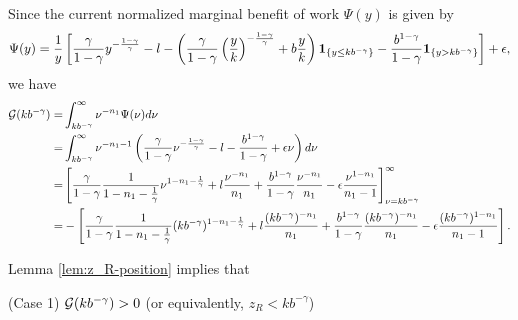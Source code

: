 \documentclass[a4paper,report, 11pt]{article}
\def\e{\epsilon}
\def\g{\gamma}
\begin{document}
{Since the current normalized marginal benefit of work $\Psi(y)$ is given by 
\begin{equation*}
\Psi(y)=\dfrac{1}{y}\left[\dfrac{\g}{1-\g}y^{-\frac{1-\g}{\g}}-l-\left(\dfrac{\g}{1-\g}\left(\dfrac{y}{k}\right)^{-\frac{1-\g}{\g}}+b\dfrac{y}{k}\right){\bf 1}_{\{y\le k b^{-\g} \}}-\dfrac{b^{1-\g}}{1-\g}{\bf 1}_{\{y>k b^{-\g}\}}\right]+\e,
\end{equation*}
we have
\begin{align*}
{\cal G}(kb^{-\g})=&\int_{kb^{-\g}}^\infty \nu^{-n_1}\Psi(\nu)d\nu\\
=&\int_{kb^{-\g}}^\infty \nu^{-n_1-1}\left(\dfrac{\g}{1-\g}\nu^{-\frac{1-\g}{\g}}-l-\dfrac{b^{1-\g}}{1-\g}+\e\nu\right)d\nu\\
=&\left[\dfrac{\g}{1-\g}\dfrac{1}{1-n_1-\frac{1}{\g}}\nu^{1-n_1-\frac{1}{\g}}+l\dfrac{\nu^{-n_1}}{n_1}+\dfrac{b^{1-\g}}{1-\g}\dfrac{\nu^{-n_1}}{n_1}-\e\dfrac{\nu^{1-n_1}}{n_1-1}\right]_{\nu=kb^{-\g}}^{\infty}\\
=&-\left[\dfrac{\g}{1-\g}\dfrac{1}{1-n_1-\frac{1}{\g}}(kb^{-\g})^{1-n_1-\frac{1}{\g}}+l\dfrac{(kb^{-\g})^{-n_1}}{n_1}+\dfrac{b^{1-\g}}{1-\g}\dfrac{(kb^{-\g})^{-n_1}}{n_1}-\e\dfrac{(kb^{-\g})^{1-n_1}}{n_1-1}\right].
\end{align*}

\noindent Lemma \ref{lem:z_R-position} implies that
\item[(Case 1)] ${\cal G}(kb^{-\g})>0$ (or equivalently, $z_R<kb^{-\g}$)\\

}
\end{document}
